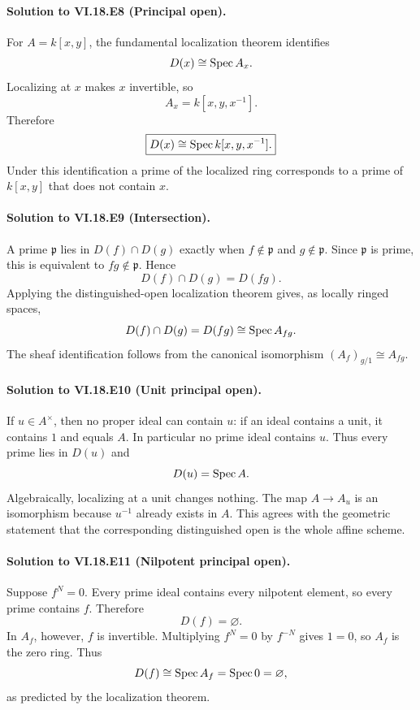 \paragraph{Solution to VI.18.E8 (Principal open).}
\begin{solution}
For $A=k[x,y]$, the fundamental localization theorem identifies
\[
D(x)\cong\operatorname{Spec} A_x.
\]
Localizing at $x$ makes $x$ invertible, so
\[
A_x=k[x,y,x^{-1}].
\]
Therefore
\[
\boxed{D(x)\cong\operatorname{Spec} k[x,y,x^{-1}].}
\]
Under this identification a prime of the localized ring corresponds to a prime of $k[x,y]$ that does not contain $x$.
\end{solution}

\paragraph{Solution to VI.18.E9 (Intersection).}
\begin{solution}
A prime $\mathfrak p$ lies in $D(f)\cap D(g)$ exactly when $f\notin\mathfrak p$ and $g\notin\mathfrak p$. Since $\mathfrak p$ is prime, this is equivalent to $fg\notin\mathfrak p$. Hence
\[
D(f)\cap D(g)=D(fg).
\]
Applying the distinguished-open localization theorem gives, as locally ringed spaces,
\[
D(f)\cap D(g)=D(fg)\cong\operatorname{Spec} A_{fg}.
\]
The sheaf identification follows from the canonical isomorphism $(A_f)_{g/1}\cong A_{fg}$.
\end{solution}

\paragraph{Solution to VI.18.E10 (Unit principal open).}
\begin{solution}
If $u\in A^\times$, then no proper ideal can contain $u$: if an ideal contains a unit, it contains $1$ and equals $A$. In particular no prime ideal contains $u$. Thus every prime lies in $D(u)$ and
\[
D(u)=\operatorname{Spec} A.
\]
Algebraically, localizing at a unit changes nothing. The map $A\to A_u$ is an isomorphism because $u^{-1}$ already exists in $A$. This agrees with the geometric statement that the corresponding distinguished open is the whole affine scheme.
\end{solution}

\paragraph{Solution to VI.18.E11 (Nilpotent principal open).}
\begin{solution}
Suppose $f^N=0$. Every prime ideal contains every nilpotent element, so every prime contains $f$. Therefore
\[
D(f)=\varnothing.
\]
In $A_f$, however, $f$ is invertible. Multiplying $f^N=0$ by $f^{-N}$ gives $1=0$, so $A_f$ is the zero ring. Thus
\[
D(f)\cong\operatorname{Spec} A_f=\operatorname{Spec}0=\varnothing,
\]
as predicted by the localization theorem.
\end{solution}

